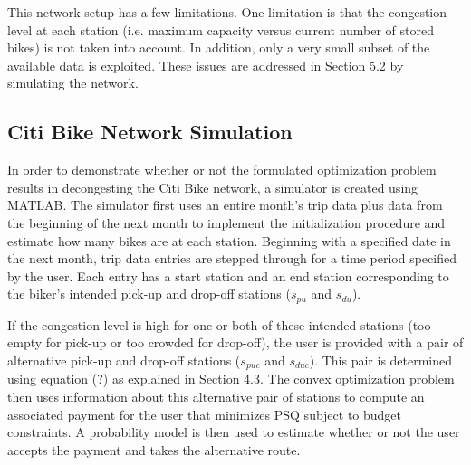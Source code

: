 \documentclass[times, 10pt,twocolumn]{article}
\begin{document}
This network setup has a few limitations. One limitation is that the congestion level at each station (i.e. maximum capacity versus current number of stored bikes) is not taken into account. In addition, only a very small subset of the available data is exploited. These issues are addressed in Section 5.2 by simulating the network.

\subsection{Citi Bike Network Simulation}

In order to demonstrate whether or not the formulated optimization problem results in decongesting the Citi Bike network, a simulator is created using MATLAB. The simulator first uses an entire month's trip data plus data from the beginning of the next month to implement the initialization procedure and estimate how many bikes are at each station. Beginning with a specified date in the next month, trip data entries are stepped through for a time period specified by the user. Each entry has a start station and an end station corresponding to the biker's intended pick-up and drop-off stations ($s_{pu}$ and $s_{du}$).

If the congestion level is high for one or both of these intended stations (too empty for pick-up or too crowded for drop-off), the user is provided with a pair of alternative pick-up and drop-off stations ($s_{puc}$ and $s_{duc}$). This pair is determined using equation (?) as explained in Section 4.3. The convex optimization problem then uses information about this alternative pair of stations to compute an associated payment for the user that minimizes PSQ subject to budget constraints. A probability model is then used to estimate whether or not the user accepts the payment and takes the alternative route.
\end{document}
